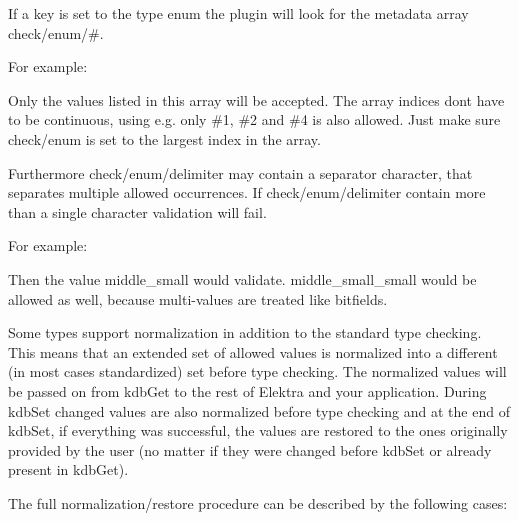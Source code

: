 If a key is set to the type {\ttfamily enum} the plugin will look for the metadata array {\ttfamily check/enum/\#}.

For example\+:


\begin{DoxyCode}{0}
\end{DoxyCode}


Only the values listed in this array will be accepted. The array indices don\textquotesingle{}t have to be continuous, using e.\+g. only {\ttfamily \#1}, {\ttfamily \#2} and {\ttfamily \#4} is also allowed. Just make sure {\ttfamily check/enum} is set to the largest index in the array.

Furthermore {\ttfamily check/enum/delimiter} may contain a separator character, that separates multiple allowed occurrences. If {\ttfamily check/enum/delimiter} contain more than a single character validation will fail.

For example\+:


\begin{DoxyCode}{0}
\end{DoxyCode}


Then the value {\ttfamily middle\+\_\+small} would validate. {\ttfamily middle\+\_\+small\+\_\+small} would be allowed as well, because multi-\/values are treated like bitfields.

Some types support normalization in addition to the standard type checking. This means that an extended set of allowed values is normalized into a different (in most cases standardized) set before type checking. The normalized values will be passed on from {\ttfamily kdb\+Get} to the rest of Elektra and your application. During {\ttfamily kdb\+Set} changed values are also normalized before type checking and at the end of {\ttfamily kdb\+Set}, if everything was successful, the values are restored to the ones originally provided by the user (no matter if they were changed before {\ttfamily kdb\+Set} or already present in {\ttfamily kdb\+Get}).

The full normalization/restore procedure can be described by the following cases\+:



